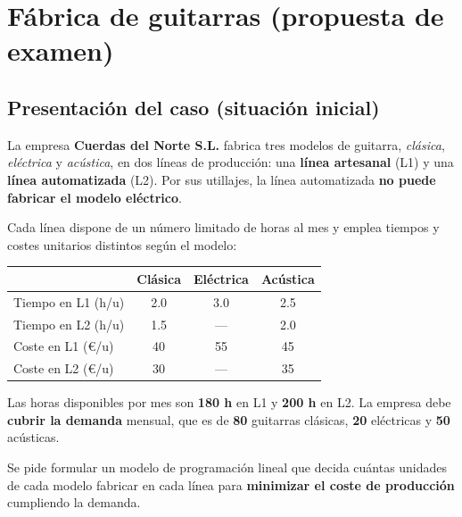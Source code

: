 \section{Fábrica de guitarras (propuesta de examen)}


\subsection{Presentación del caso (situación inicial)}
La empresa \textbf{Cuerdas del Norte S.L.} fabrica tres modelos de guitarra, \textit{clásica}, \textit{eléctrica} y \textit{acústica}, en dos líneas de producción: una \textbf{línea artesanal} (L1) y una \textbf{línea automatizada} (L2). Por sus utillajes, la línea automatizada \textbf{no puede fabricar el modelo eléctrico}.

Cada línea dispone de un número limitado de horas al mes y emplea tiempos y costes unitarios distintos según el modelo:

\begin{center}
\begin{tabular}{lccc}
\toprule
 & \textbf{Clásica} & \textbf{Eléctrica} & \textbf{Acústica}\\
\midrule
Tiempo en L1 (h/u)  & 2.0 & 3.0 & 2.5\\
Tiempo en L2 (h/u)  & 1.5 & --- & 2.0\\
Coste en L1 (€/u) & 40 & 55 & 45\\
Coste en L2 (€/u) & 30 & --- & 35\\
\bottomrule
\end{tabular}
\end{center}

Las horas disponibles por mes son \textbf{180 h} en L1 y \textbf{200 h} en L2. La empresa debe \textbf{cubrir la demanda} mensual, que es de \textbf{80} guitarras clásicas, \textbf{20} eléctricas y \textbf{50} acústicas.

Se pide formular un modelo de programación lineal que decida cuántas unidades de cada modelo fabricar en cada línea para \textbf{minimizar el coste de producción} cumpliendo la demanda.

